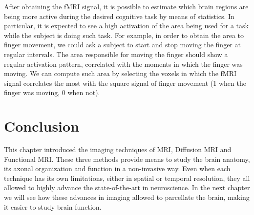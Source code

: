 After obtaining the fMRI signal, it is possible to estimate which brain regions
are being more active during the desired cognitive task by means of statistics.
In particular, it is expected to see a high activation of the area being used
for a task while the subject is doing such task. For example, in order to
obtain the area to finger movement, we could ask a subject to start and stop
moving the finger at regular intervals. The area responsible for moving the
finger should show a regular activation pattern, correlated with the moments
in which the finger was moving. We can compute such area by selecting the voxels
in which the fMRI signal correlates the most with the square signal of finger
movement (1 when the finger was moving, 0 when not).

\section{Conclusion}
This chapter introduced the imaging techniques of MRI, Diffusion MRI and
Functional MRI. These three methods provide means to study the brain anatomy,
its axonal organization and function in a non-invasive way. Even when each
technique has its own limitations, either in spatial or temporal resolution,
they all allowed to highly advance the state-of-the-art in neuroscience. In
the next chapter we will see how these advances in imaging allowed to parcellate
the brain, making it easier to study brain function.

\chapterbib




%

